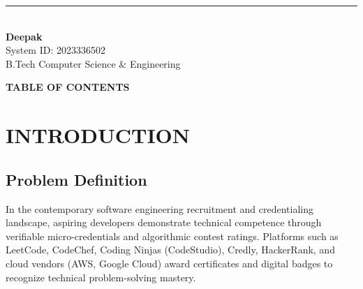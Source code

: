 \documentclass[12pt,a4paper]{article}
\makeatletter
\renewcommand\tableofcontents{%
    \newpage
    \vspace*{0pt}
    \begin{center}
      {\Large\bfseries TABLE OF CONTENTS\par}
    \end{center}
    \vspace{0.4cm}
    \@starttoc{toc}%
}
\makeatother
\begin{document}
\vspace{2.0cm}
\noindent
\begin{flushright}
    \rule{5.5cm}{0.6pt}\\[0.15cm]
    \textbf{Deepak}\\
    System ID: 2023336502\\
    B.Tech Computer Science \& Engineering
\end{flushright}

\newpage

\tableofcontents

\newpage
\setcounter{page}{1}

\section{INTRODUCTION}

\subsection{Problem Definition}
In the contemporary software engineering recruitment and credentialing landscape, aspiring developers demonstrate technical competence through verifiable micro-credentials and algorithmic contest ratings. Platforms such as LeetCode, CodeChef, Coding Ninjas (CodeStudio), Credly, HackerRank, and cloud vendors (AWS, Google Cloud) award certificates and digital badges to recognize technical problem-solving mastery. 
\end{document}
